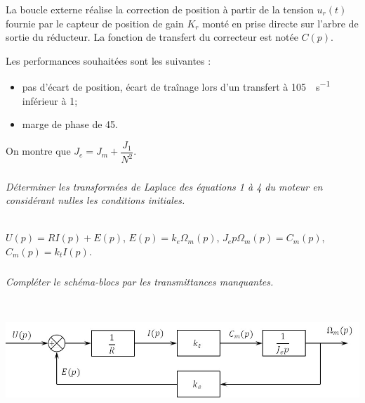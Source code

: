 \documentclass[10pt,fleqn]{article} %
\begin{document}
\begin{multicols}{2}
La boucle externe  réalise  la  correction de position à partir de  la  tension $u_r(t)$  fournie par  le 
capteur de position de gain $K_r$ monté  en prise directe  sur  l’arbre de  sortie du  réducteur. La 
fonction de transfert du correcteur est notée $C(p)$. 

Les performances souhaitées sont les suivantes : 
\begin{itemize}
\item pas d’écart de position, écart de traînage lors d’un transfert à \SI{105}{\degres.s^{-1}} inférieur à 1\degres ; 
\item marge de phase de 45\degres. 
\end{itemize}

On montre que $J_e = J_m + \dfrac{J_1}{N^2}$.


\subparagraph{}\textit{Déterminer les transformées de Laplace des équations 1 à 4 du moteur
 en considérant nulles les conditions initiales. }
\ifprof
\begin{corrige}~\\
$U(p) = RI(p) + E(p)$, $E(p) =k_e \Omega_m(p)$, $J_e p \Omega_m(p)=C_m(p)$, $C_m(p)=k_t I(p)$.
\end{corrige}
\else
\fi


\subparagraph{}\textit{Compléter le schéma-blocs par les transmittances manquantes. }
\ifprof
\begin{corrige}~\\
\begin{center}
\includegraphics[width=\linewidth]{images/cor_01}
\end{center}

\end{corrige}
\else
\fi


\end{multicols}
\end{document}
